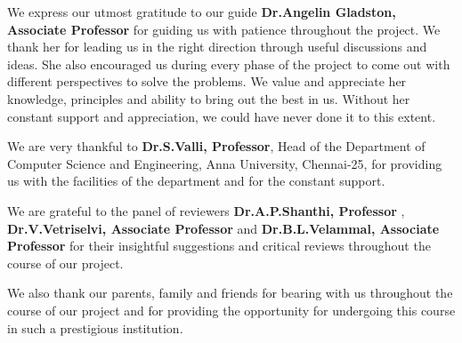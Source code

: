 \par
We express our utmost gratitude to our guide \textbf{Dr.Angelin Gladston, Associate Professor} for guiding us with patience throughout the project. We thank her for leading us in the right direction through useful discussions and ideas. She also encouraged us during every phase of the project to come out with different perspectives to solve the problems. We value and appreciate  her knowledge, principles and ability to bring out the best in us. Without her constant support and appreciation, we could have never done it to this extent.
\par
We are very thankful to \textbf{Dr.S.Valli, Professor}, Head of the Department of Computer Science and Engineering, Anna University, Chennai-25, for providing us with the facilities of the department and for the constant support.
\par
We are grateful to the panel of reviewers \textbf{Dr.A.P.Shanthi, Professor} , \textbf{Dr.V.Vetriselvi,	Associate Professor} and \textbf{Dr.B.L.Velammal, Associate Professor} for their insightful suggestions and critical reviews throughout the course of our project.
\par
We also thank our parents, family and friends for bearing with us throughout the course of our project and for providing the opportunity for undergoing this course in such a prestigious institution.
